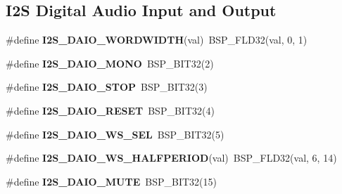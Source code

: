 \subsection*{I2S Digital Audio Input and Output}
\begin{DoxyCompactItemize}
\item 
\mbox{\label{group__lpc__i2s_gabedfe1e20144f730c927e6f0dacf20b1}} 
\#define {\bfseries I2\+S\+\_\+\+D\+A\+I\+O\+\_\+\+W\+O\+R\+D\+W\+I\+D\+TH}(val)~B\+S\+P\+\_\+\+F\+L\+D32(val, 0, 1)
\item 
\mbox{\label{group__lpc__i2s_gacc617142f109665b6de5e287a2955e65}} 
\#define {\bfseries I2\+S\+\_\+\+D\+A\+I\+O\+\_\+\+M\+O\+NO}~B\+S\+P\+\_\+\+B\+I\+T32(2)
\item 
\mbox{\label{group__lpc__i2s_ga74a52659e67178d2bf49710c92f6fb85}} 
\#define {\bfseries I2\+S\+\_\+\+D\+A\+I\+O\+\_\+\+S\+T\+OP}~B\+S\+P\+\_\+\+B\+I\+T32(3)
\item 
\mbox{\label{group__lpc__i2s_ga7d99c82913e3d97522163860d1c24b73}} 
\#define {\bfseries I2\+S\+\_\+\+D\+A\+I\+O\+\_\+\+R\+E\+S\+ET}~B\+S\+P\+\_\+\+B\+I\+T32(4)
\item 
\mbox{\label{group__lpc__i2s_ga4bfc5198127b9966d7624deb04cd1cc4}} 
\#define {\bfseries I2\+S\+\_\+\+D\+A\+I\+O\+\_\+\+W\+S\+\_\+\+S\+EL}~B\+S\+P\+\_\+\+B\+I\+T32(5)
\item 
\mbox{\label{group__lpc__i2s_gaf9b9189d5c506e3345a4d950b3ef9bd1}} 
\#define {\bfseries I2\+S\+\_\+\+D\+A\+I\+O\+\_\+\+W\+S\+\_\+\+H\+A\+L\+F\+P\+E\+R\+I\+OD}(val)~B\+S\+P\+\_\+\+F\+L\+D32(val, 6, 14)
\item 
\mbox{\label{group__lpc__i2s_ga8744148d258b8b1f653e12794ae5951d}} 
\#define {\bfseries I2\+S\+\_\+\+D\+A\+I\+O\+\_\+\+M\+U\+TE}~B\+S\+P\+\_\+\+B\+I\+T32(15)
\end{DoxyCompactItemize}
